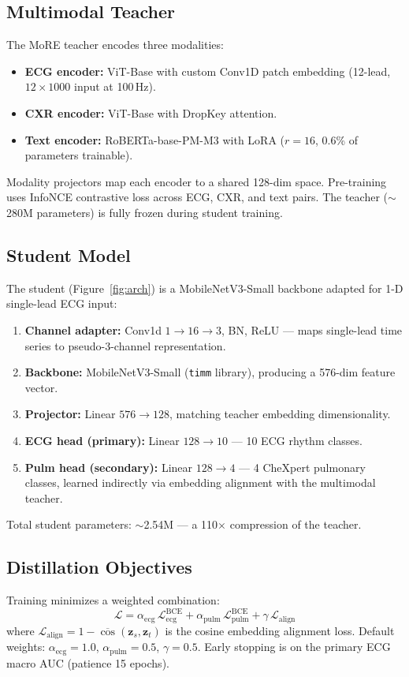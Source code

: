 \documentclass[sigconf,nonacm]{acmart}
\begin{document}
\subsection{Multimodal Teacher}
The MoRE teacher encodes three modalities:
\begin{itemize}[noitemsep]
  \item \textbf{ECG encoder:} ViT-Base with custom Conv1D patch embedding
        (12-lead, $12\times1000$ input at 100\,Hz).
  \item \textbf{CXR encoder:} ViT-Base with DropKey attention.
  \item \textbf{Text encoder:} RoBERTa-base-PM-M3 with LoRA ($r=16$,
        0.6\% of parameters trainable).
\end{itemize}
Modality projectors map each encoder to a shared 128-dim space.
Pre-training uses InfoNCE contrastive loss across ECG, CXR, and text
pairs. The teacher ($\sim$280M parameters) is fully frozen during student training.

\subsection{Student Model}
The student (Figure~\ref{fig:arch}) is a MobileNetV3-Small backbone
adapted for 1-D single-lead ECG input:

\begin{enumerate}[noitemsep]
  \item \textbf{Channel adapter:} Conv1d $1\to16\to3$, BN, ReLU — maps
        single-lead time series to pseudo-3-channel representation.
  \item \textbf{Backbone:} MobileNetV3-Small (\texttt{timm} library),
        producing a 576-dim feature vector.
  \item \textbf{Projector:} Linear $576\to128$, matching teacher embedding
        dimensionality.
  \item \textbf{ECG head (primary):} Linear $128\to10$ — 10 ECG rhythm
        classes.
  \item \textbf{Pulm head (secondary):} Linear $128\to4$ — 4 CheXpert
        pulmonary classes, learned indirectly via embedding alignment with
        the multimodal teacher.
\end{enumerate}
Total student parameters: $\sim$2.54M — a 110$\times$ compression of the teacher.

\subsection{Distillation Objectives}
Training minimizes a weighted combination:
\begin{equation}
  \mathcal{L} = \alpha_{\text{ecg}}\,\mathcal{L}_{\text{ecg}}^{\text{BCE}}
              + \alpha_{\text{pulm}}\,\mathcal{L}_{\text{pulm}}^{\text{BCE}}
              + \gamma\,\mathcal{L}_{\text{align}}
\end{equation}
where $\mathcal{L}_{\text{align}} = 1 - \overline{\cos}(\mathbf{z}_s, \mathbf{z}_t)$
is the cosine embedding alignment loss. Default weights:
$\alpha_{\text{ecg}}=1.0$, $\alpha_{\text{pulm}}=0.5$, $\gamma=0.5$.
Early stopping is on the primary ECG macro AUC (patience 15 epochs).
\end{document}
